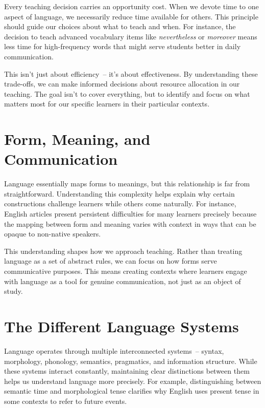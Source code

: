 Every teaching decision carries an opportunity cost. When we devote time to one aspect of language, we necessarily reduce time available for others. This principle should guide our choices about what to teach and when. For instance, the decision to teach advanced vocabulary items like \textit{nevertheless} or \textit{moreover} means less time for high-frequency words that might serve students better in daily communication.

This isn't just about efficiency~-- it's about effectiveness. By understanding these trade-offs, we can make informed decisions about resource allocation in our teaching. The goal isn't to cover everything, but to identify and focus on what matters most for our specific learners in their particular contexts.

\section*{Form, Meaning, and Communication}

Language essentially maps forms to meanings, but this relationship is far from straightforward. Understanding this complexity helps explain why certain constructions challenge learners while others come naturally. For instance, English articles present persistent difficulties for many learners precisely because the mapping between form and meaning varies with context in ways that can be opaque to non-native speakers.

This understanding shapes how we approach teaching. Rather than treating language as a set of abstract rules, we can focus on how forms serve communicative purposes. This means creating contexts where learners engage with language as a tool for genuine communication, not just as an object of study.

\section*{The Different Language Systems}

Language operates through multiple interconnected systems~-- syntax, morphology, phonology, semantics, pragmatics, and information structure. While these systems interact constantly, maintaining clear distinctions between them helps us understand language more precisely. For example, distinguishing between semantic time and morphological tense clarifies why English uses present tense in some contexts to refer to future events.

